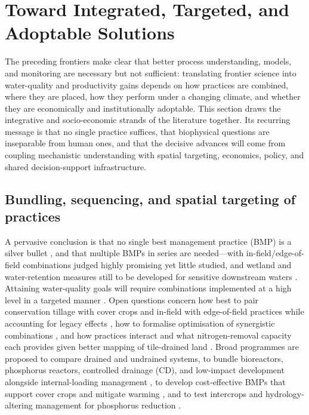 \section{Toward Integrated, Targeted, and Adoptable Solutions}

The preceding frontiers make clear that better process understanding, models,
and monitoring are necessary but not sufficient: translating frontier science
into water-quality and productivity gains depends on how practices are
combined, where they are placed, how they perform under a changing climate, and
whether they are economically and institutionally adoptable. This section draws
the integrative and socio-economic strands of the literature together. Its
recurring message is that no single practice suffices, that biophysical
questions are inseparable from human ones, and that the decisive advances will
come from coupling mechanistic understanding with spatial targeting, economics,
policy, and shared decision-support infrastructure.

\subsection{Bundling, sequencing, and spatial targeting of practices}

A pervasive conclusion is that no single best management practice (BMP) is a
silver bullet \parencite{Sunohara2016}, and that multiple BMPs in series are
needed---with in-field/edge-of-field combinations judged highly promising yet
little studied, and wetland and water-retention measures still to be developed
for sensitive downstream waters \parencite{Lenhart2016}. Attaining water-quality
goals will require combinations implemented at a high level in a targeted manner
\parencite{Christianson2014}. Open questions concern how best to pair
conservation tillage with cover crops and in-field with edge-of-field practices
while accounting for legacy effects \parencite{Makhtoumi2025}, how to formalise
optimisation of synergistic combinations \parencite{Kreig2019}, and how
practices interact and what nitrogen-removal capacity each provides given better
mapping of tile-drained land \parencite{McLellan2015}. Broad programmes are
proposed to compare drained and undrained systems, to bundle bioreactors,
phosphorus reactors, controlled drainage (CD), and low-impact development
alongside internal-loading management \parencite{Baulch2019,Husk2024,Husk2017},
to develop cost-effective BMPs that support cover crops and mitigate warming
\parencite{Gupta2023}, and to test intercrops and hydrology-altering management
for phosphorus reduction \parencite{HernandezRamirez2011,GAYNOR1995b}.

